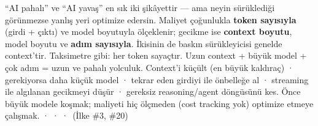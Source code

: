 
 ``AI pahalı'' ve ``AI yavaş'' en sık iki şikâyettir --- ama neyin
sürüklediği görünmezse yanlış yeri optimize edersin.
 Maliyet çoğunlukla \textbf{token sayısıyla} (girdi + çıktı) ve model
boyutuyla ölçeklenir; gecikme ise \textbf{context boyutu}, model boyutu ve
\textbf{adım sayısıyla}. İkisinin de baskın sürükleyicisi genelde context'tir.
 Taksimetre gibi: her token sayaçtır. Uzun context + büyük model + çok
adım = uzun ve pahalı yolculuk.
 Context'i küçült (en büyük kaldıraç) · gerekiyorsa daha küçük
model · tekrar eden girdiyi  ile önbelleğe al · streaming ile
algılanan gecikmeyi düşür · gereksiz reasoning/agent döngüsünü kes.
 Önce büyük modele koşmak; maliyeti hiç ölçmeden (cost tracking yok)
optimize etmeye çalışmak.
  ·  ·  ·  \,{\scriptsize\color{softgray}(İlke \#3, \#20)}
